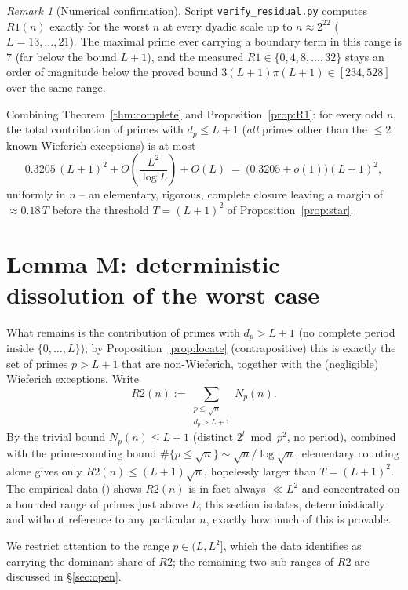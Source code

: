 \documentclass[11pt]{article}
\theoremstyle{plain}
\theoremstyle{definition}
\theoremstyle{remark}
\newtheorem{remark}[theorem]{Remark}
\newcommand{\dpp}{d_p}
\begin{document}
\begin{remark}[Numerical confirmation]
Script \texttt{verify\_residual.py} computes $R1(n)$ exactly for the worst
$n$ at every dyadic scale up to $n\approx2^{22}$ ($L=13,\dots,21$). The
maximal prime ever carrying a boundary term in this range is $7$ (far below
the bound $L+1$), and the measured $R1\in\{0,4,8,\dots,32\}$ stays an order of
magnitude below the proved bound $3(L+1)\pi(L+1)\in[234,528]$ over the same
range.
\end{remark}

Combining Theorem~\ref{thm:complete} and Proposition~\ref{prop:R1}: for every
odd $n$, the total contribution of primes with $\dpp\le L+1$ (\emph{all}
primes other than the $\le2$ known Wieferich exceptions) is at most
\[
0.3205\,(L+1)^2+O\!\left(\frac{L^2}{\log L}\right)+O(L)
\ =\ \bigl(0.3205+o(1)\bigr)(L+1)^2,
\]
uniformly in $n$ -- an elementary, rigorous, complete closure leaving a
margin of $\approx0.18\,T$ before the threshold $T=(L+1)^2$ of
Proposition~\ref{prop:star}.

\section{Lemma M: deterministic dissolution of the worst case}\label{sec:M}

What remains is the contribution of primes with $\dpp>L+1$ (no complete
period inside $\{0,\dots,L\}$); by Proposition~\ref{prop:locate} (contrapositive)
this is exactly the set of primes $p>L+1$ that are non-Wieferich, together
with the (negligible) Wieferich exceptions. Write
\[
R2(n):=\sum_{\substack{p\le\sqrt n\\ \dpp>L+1}}N_p(n).
\]
By the trivial bound $N_p(n)\le L+1$ (distinct $2^l\bmod p^2$, no period),
combined with the prime-counting bound $\#\{p\le\sqrt n\}\sim\sqrt n/\log\sqrt n$,
elementary counting alone gives only $R2(n)\le(L+1)\sqrt n$, hopelessly larger
than $T=(L+1)^2$. The empirical data (\cite{erdos11data}) shows $R2(n)$ is in
fact always $\ll L^2$ and concentrated on a bounded range of primes just
above $L$; this section isolates, deterministically and without reference to
any particular $n$, exactly how much of this is provable.

We restrict attention to the range $p\in(L,L^2]$, which the data identifies
as carrying the dominant share of $R2$; the remaining two sub-ranges of $R2$
are discussed in \S\ref{sec:open}.
\end{document}
